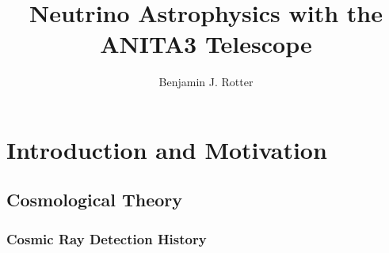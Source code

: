 \documentclass[11pt]{uhthesis}
\title{Neutrino Astrophysics with the ANITA3 Telescope}
\author{Benjamin J. Rotter}
\begin{document}
\maketitle

\begin{frontmatter}



%

%



\tableofcontents



\end{frontmatter}


%


%
%
%



\chapter{Introduction and Motivation}


\section{Cosmological Theory}
	\subsection{Cosmic Ray Detection History}
	
\end{document}
